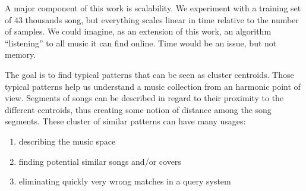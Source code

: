 \documentclass{article}
\begin{document}
A major component of this work is scalability. We experiment with a training
set of $43$ thousands song, but everything scales linear in time
relative to the number of samples. We could imagine, as an extension
of this work, an algorithm ``listening'' to all music it can find online.
Time would be an issue, but not memory.



%

The goal is to find typical patterns that can be seen as cluster centroids.
Those typical patterns help us understand a music collection from an
harmonic point of view. Segments of songs can be described in regard to their
proximity to the different centroids, thus creating some notion of distance
among the song segments. These cluster of similar patterns can have many usages:
\begin{enumerate}
\item describing the music space
\item finding potential similar songs and/or covers
\item eliminating quickly very wrong matches in a query system
\end{enumerate}
\end{document}
